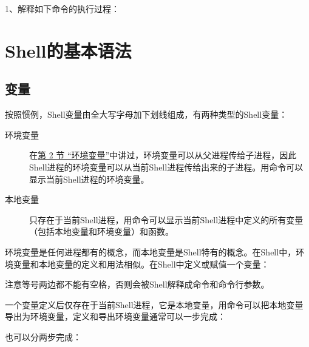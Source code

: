 1、解释如下命令的执行过程：






\section{Shell的基本语法}
%
\subsection{变量}
%


按照惯例，Shell变量由全大写字母加下划线组成，有两种类型的Shell变量：


\begin{description}
\item[{环境变量}]


在\hyperlink{db.ch30s02.id2865687}{第 2 节 “环境变量”}中讲过，环境变量可以从父进程传给子进程，因此Shell进程的环境变量可以从当前Shell进程传给出来的子进程。用命令可以显示当前Shell进程的环境变量。

\item[{本地变量}]


只存在于当前Shell进程，用命令可以显示当前Shell进程中定义的所有变量（包括本地变量和环境变量）和函数。


\end{description}


环境变量是任何进程都有的概念，而本地变量是Shell特有的概念。在Shell中，环境变量和本地变量的定义和用法相似。在Shell中定义或赋值一个变量：




注意等号两边都不能有空格，否则会被Shell解释成命令和命令行参数。



一个变量定义后仅存在于当前Shell进程，它是本地变量，用命令可以把本地变量导出为环境变量，定义和导出环境变量通常可以一步完成：




也可以分两步完成：


